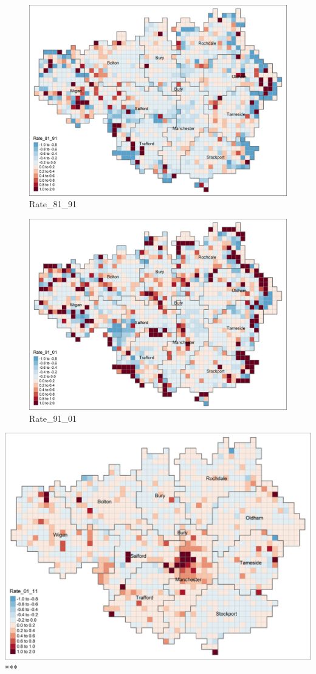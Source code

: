 \documentclass[
]{article}
\begin{document}
\begin{figure}
\centering
\includegraphics{Rate_81_91.png}
\caption{Rate\_81\_91}
\end{figure}

\begin{figure}
\centering
\includegraphics{Rate_91_01.png}
\caption{Rate\_91\_01}
\end{figure}

\includegraphics{Rate_01_11.png} ***
\end{document}
